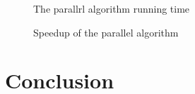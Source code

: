 \documentclass{svproc}
\begin{document}
\begin{figure}[ht]
\caption{The parallrl algorithm running time}
\label{fig_time}
\end{figure}


\begin{figure}[ht]
\caption{Speedup of the parallel algorithm}
\label{fig_speedup}
\end{figure}




\section{Conclusion }
\end{document}
